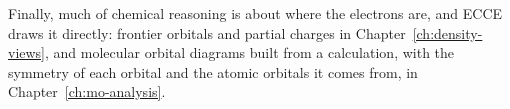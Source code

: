 Finally, much of chemical reasoning is about where the electrons are, and ECCE draws it directly: frontier orbitals and partial charges in Chapter~\ref{ch:density-views}, and molecular orbital diagrams built from a calculation, with the symmetry of each orbital and the atomic orbitals it comes from, in Chapter~\ref{ch:mo-analysis}.
